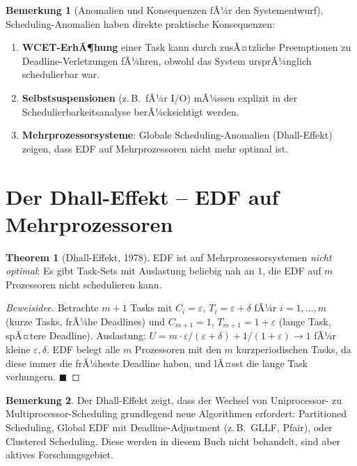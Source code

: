 ﻿\documentclass[a4paper,12pt]{report}
\theoremstyle{definition}
\newtheorem{bemerkung}{Bemerkung}[chapter]
\newtheorem{theorem}{Theorem}[chapter]
\begin{document}
\begin{bemerkung}[Anomalien und Konsequenzen fÃ¼r den Systementwurf]
	Scheduling-Anomalien haben direkte praktische Konsequenzen:
	\begin{enumerate}
		\item \textbf{WCET-ErhÃ¶hung} einer Task kann durch zusÃ¤tzliche Preemptionen
		      zu Deadline-Verletzungen fÃ¼hren, obwohl das System ursprÃ¼nglich
		      schedulierbar war.
		\item \textbf{Selbstsuspensionen} (z.\,B.\ fÃ¼r I/O) mÃ¼ssen explizit in
		      der Schedulierbarkeitsanalyse berÃ¼cksichtigt werden.
		\item \textbf{Mehrprozessorsysteme}: Globale Scheduling-Anomalien
		      (Dhall-Effekt) zeigen, dass EDF auf Mehrprozessoren nicht mehr
		      optimal ist.
	\end{enumerate}
\end{bemerkung}

\section{Der Dhall-Effekt -- EDF auf Mehrprozessoren}

\begin{theorem}[Dhall-Effekt, 1978]
	EDF ist auf Mehrprozessorsystemen \emph{nicht optimal}: Es gibt Task-Sets
	mit Auslastung beliebig nah an $1$, die EDF auf $m$ Prozessoren nicht
	schedulieren kann.
\end{theorem}

\begin{proof}[Beweisidee]
	Betrachte $m+1$ Tasks mit $C_i = \varepsilon$, $T_i = \varepsilon + \delta$
	fÃ¼r $i=1,\ldots,m$ (kurze Tasks, frÃ¼he Deadlines) und $C_{m+1} = 1$,
	$T_{m+1} = 1+\varepsilon$ (lange Task, spÃ¤tere Deadline). Auslastung:
	$U = m \cdot \varepsilon/(\varepsilon+\delta) + 1/(1+\varepsilon) \to 1$
	fÃ¼r kleine $\varepsilon, \delta$. EDF belegt alle $m$ Prozessoren mit
	den $m$ kurzperiodischen Tasks, da diese immer die frÃ¼heste Deadline haben,
	und lÃ¤sst die lange Task verhungern. \hfill$\blacksquare$
\end{proof}

\begin{bemerkung}
	Der Dhall-Effekt zeigt, dass der Wechsel von Uniprocessor- zu
	Multiprocessor-Scheduling grundlegend neue Algorithmen erfordert:
	Partitioned Scheduling, Global EDF mit Deadline-Adjustment (z.\,B.\
	GLLF, Pfair), oder Clustered Scheduling. Diese werden in diesem Buch
	nicht behandelt, sind aber aktives Forschungsgebiet.
\end{bemerkung}
\end{document}
